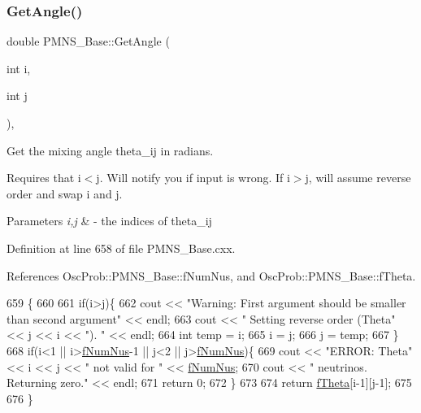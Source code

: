 \subsubsection{\texorpdfstring{Get\+Angle()}{GetAngle()}}
{\footnotesize\ttfamily double P\+M\+N\+S\+\_\+\+Base\+::\+Get\+Angle (\begin{DoxyParamCaption}\item[{int}]{i,  }\item[{int}]{j }\end{DoxyParamCaption})\hspace{0.3cm}{\ttfamily [virtual]}, {\ttfamily [inherited]}}

Get the mixing angle theta\+\_\+ij in radians.

Requires that i$<$j. Will notify you if input is wrong. If i$>$j, will assume reverse order and swap i and j.


\begin{DoxyParams}{Parameters}
{\em i,j} & -\/ the indices of theta\+\_\+ij \\
\hline
\end{DoxyParams}


Definition at line 658 of file P\+M\+N\+S\+\_\+\+Base.\+cxx.



References Osc\+Prob\+::\+P\+M\+N\+S\+\_\+\+Base\+::f\+Num\+Nus, and Osc\+Prob\+::\+P\+M\+N\+S\+\_\+\+Base\+::f\+Theta.


\begin{DoxyCode}
659 \{
660 
661   \textcolor{keywordflow}{if}(i>j)\{
662     cout << \textcolor{stringliteral}{"Warning: First argument should be smaller than second argument"} << endl;
663     cout << \textcolor{stringliteral}{"         Setting reverse order (Theta"} << j << i << \textcolor{stringliteral}{"). "} << endl;
664     \textcolor{keywordtype}{int} temp = i;
665     i = j;
666     j = temp;
667   \}
668   \textcolor{keywordflow}{if}(i<1 || i>\hyperlink{classOscProb_1_1PMNS__Base_a24bb74bed63569dfe88b18fa6a08060e}{fNumNus}-1 || j<2 || j>\hyperlink{classOscProb_1_1PMNS__Base_a24bb74bed63569dfe88b18fa6a08060e}{fNumNus})\{
669     cout << \textcolor{stringliteral}{"ERROR: Theta"} << i << j << \textcolor{stringliteral}{" not valid for "} << \hyperlink{classOscProb_1_1PMNS__Base_a24bb74bed63569dfe88b18fa6a08060e}{fNumNus};
670     cout << \textcolor{stringliteral}{" neutrinos. Returning zero."} << endl;
671     \textcolor{keywordflow}{return} 0;
672   \}
673 
674   \textcolor{keywordflow}{return} \hyperlink{classOscProb_1_1PMNS__Base_a1976887cd658dd86b2336c181f1470b4}{fTheta}[i-1][j-1];
675 
676 \}
\end{DoxyCode}
\mbox{\label{classOscProb_1_1PMNS__Deco_a5dadf6a39dec4a229babeff6a650179c}} 
